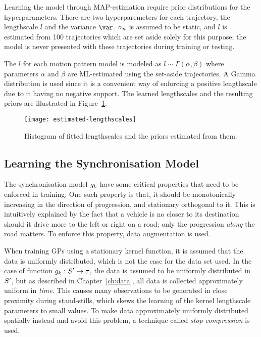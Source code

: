 Learning the model through MAP-estimation require prior distributions
for the hyperparameters. There are two hyperparemeters for each
trajectory, the lengthscale $l$ and the variance $\var$. 
$\sigma_n$ is assumed to be static, and $l$ is 
estimated from 100 trajectories which are set
aside solely for this purpose; the model is never presented with these
trajectories during training or testing.

The $l$ for each motion pattern model is modeled as 
$l \sim \Gamma(\alpha, \beta)$ where parameters $\alpha$ and $\beta$
are ML-estimated using the set-aside trajectories. A Gamma
distribution is used since it
is a convenient way of enforcing a positive lengthscale due to it
having no negative support. The learned lengthscales and the resulting
priors are illustrated in Figure~\ref{fig:estimated-lengthscales}.
\begin{figure}
  \texttt{[image: estimated-lengthscales]}
  \caption{Histogram of fitted lengthscales and the priors estimated
    from them.}\label{fig:estimated-lengthscales}
\end{figure}

\subsection{Learning the Synchronisation Model}
The synchronisation model $g_{k}$ have some critical properties
that need to be enforced in training. One such property is that, 
it should be monotonically increasing in the direction of progression,
and stationary orthogonal to it. This is intuitively explained by the fact that a
vehicle is no closer to its destination should it drive more to the
left or right on a road; only the progression \textit{along} the road
matters. To enforce this property, data augmentation is used.

When training GPs using a stationary kernel function, it is assumed
that the data is uniformly distributed, which is not the case for the
data set used. In the case of function $g_{k} : S' \mapsto
\tau$, the data is assumed to be uniformly
distributed in $S'$, but as described in Chapter~\ref{ch:data},
all data is collected approximately uniform in \textit{time}. This causes many
observations to be generated in close proximity during stand-stills, which skews the
learning of the kernel lengthscale parameters to small values. To
make data approximately uniformly distributed spatially instead and 
avoid this problem, a technique called \textit{stop compression} is used.

